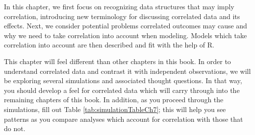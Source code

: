 \documentclass[
]{krantz}
\begin{document}
In this chapter, we first focus on recognizing data structures that may imply correlation, introducing new terminology for discussing correlated data and its effects. Next, we consider potential problems correlated outcomes may cause and why we need to take correlation into account when modeling. Models which take correlation into account are then described and fit with the help of R.

This chapter will feel different than other chapters in this book. In order to understand correlated data and contrast it with independent observations, we will be exploring several simulations and associated thought questions. In that way, you should develop a feel for correlated data which will carry through into the remaining chapters of this book. In addition, as you proceed through the simulations, fill out Table \ref{tab:simulationTableCh7}; this will help you see patterns as you compare analyses which account for correlation with those that do not.

\begin{table}
\centering
\caption{\label{tab:simulationTableCh7}Summary of simulations for Dams and Pups case study.}
\centering
{}
\end{table}
\end{document}
